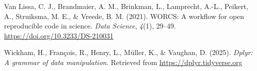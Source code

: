 \documentclass[
  english,
  man,floatsintext]{apa6}
\newlength{\cslhangindent}
\newenvironment{CSLReferences}[2] %
 {\begin{list}{}{%
  \setlength{\itemindent}{0pt}
  \setlength{\leftmargin}{0pt}
  \setlength{\parsep}{0pt}
  \ifodd #1
   \setlength{\leftmargin}{\cslhangindent}
   \setlength{\itemindent}{-1\cslhangindent}
  \fi
  \setlength{\itemsep}{#2\baselineskip}}}
 {\end{list}}
\begin{document}
\begin{CSLReferences}{1}{0}
Van Lissa, C. J., Brandmaier, A. M., Brinkman, L., Lamprecht, A.-L., Peikert, A., Struiksma, M. E., \& Vreede, B. M. (2021). {WORCS}: {A} workflow for open reproducible code in science. \emph{Data Science}, \emph{4}(1), 29--49. \url{https://doi.org/10.3233/DS-210031}

Wickham, H., François, R., Henry, L., Müller, K., \& Vaughan, D. (2025). \emph{Dplyr: A grammar of data manipulation}. Retrieved from \url{https://dplyr.tidyverse.org}

\end{CSLReferences}
\end{document}
